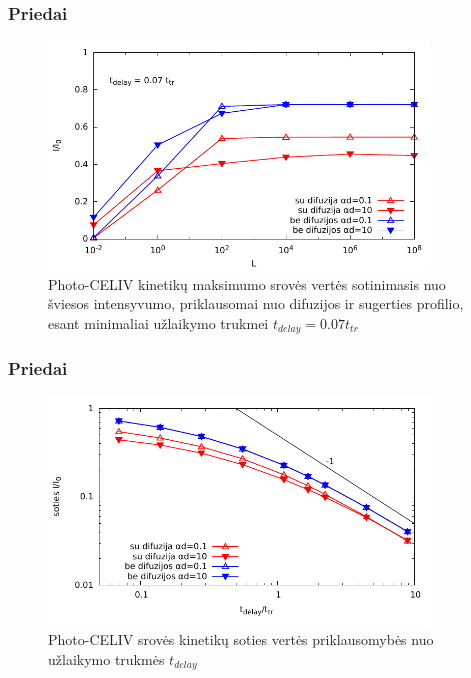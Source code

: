 \documentclass{beamer}
\begin{document}
\begin{frame}
\frametitle{Priedai}
\begin{figure}
  \centering
    \includegraphics[width=0.9\textwidth]{./media/pdf/semilogsaturation.pdf}
  \caption{Photo-CELIV kinetikų maksimumo srovės vertės sotinimasis nuo šviesos intensyvumo, priklausomai nuo difuzijos ir sugerties profilio, esant minimaliai užlaikymo trukmei $t_{delay} = 0.07t_{tr}$}
\end{figure}
\end{frame}

\begin{frame}
\frametitle{Priedai}
\begin{figure}
  \centering
	\includegraphics[width=0.9\textwidth]{./media/pdf/delays.pdf}
  \caption{Photo-CELIV srovės kinetikų soties vertės priklausomybės nuo užlaikymo trukmės $t_{delay}$}
\end{figure}
\end{frame}
\end{document}
